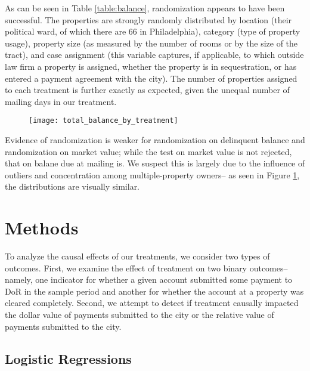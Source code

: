 \documentclass[12pt,titlepage]{article}
\begin{document}
As can be seen in Table \ref{table:balance}, randomization appears to
have been successful.  The properties are strongly randomly
distributed by location (their political ward, of which there are 66
in Philadelphia), category (type of property usage), property size (as
measured by the number of rooms or by the size of the tract), and case
assignment (this variable captures, if applicable, to which outside
law firm a property is assigned, whether the property is in
sequestration, or has entered a payment agreement with the city). The
number of properties assigned to each treatment is further exactly as
expected, given the unequal number of mailing days in our treatment.

\begin{figure}
\caption{}\label{fig:balance_balance}
\begin{center}
\texttt{[image: total\_balance\_by\_treatment]}
\par\end{center}
\end{figure}

Evidence of randomization is weaker for randomization on
delinquent balance and randomization on market value; while the test
on market value is not rejected, that on balane due at mailing is.
We suspect this is largely due to the influence of outliers and
concentration among multiple-property owners--
as seen in Figure \ref{fig:balance_balance}, the distributions
are visually similar.


\section{Methods}

To analyze the causal effects of our treatments, we consider two types of outcomes.
First, we examine the
effect of treatment on two binary outcomes--namely, one indicator for
whether a given account submitted some payment to DoR in the sample
period and another for whether the account at a property was cleared
completely. Second, we attempt to detect if treatment causally
impacted the dollar value of payments submitted to the city or the
relative value of payments submitted to the city.  

\subsection{Logistic Regressions }
\end{document}
